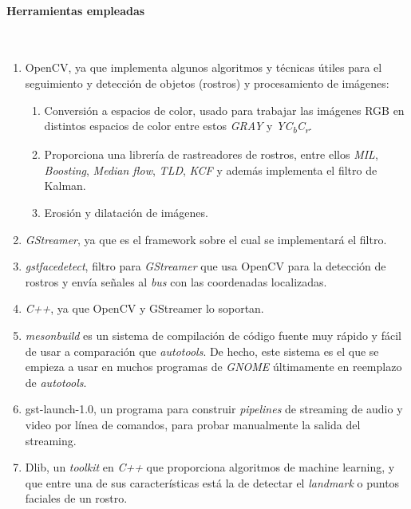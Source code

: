 \documentclass[a4paper,openright,12pt]{report}
\begin{document}
\paragraph{Herramientas empleadas}\mbox{} \\
\begin{enumerate}
    \item OpenCV, ya que implementa algunos algoritmos y técnicas
        útiles para el seguimiento y detección de objetos (rostros) y
        procesamiento de imágenes:
    \begin{enumerate}
        \item Conversión a espacios de color, usado para trabajar las imágenes
            RGB en distintos espacios de color entre estos \textit{GRAY} y
            \textit{YC\textsubscript{b}C\textsubscript{r}}.
        \item Proporciona una librería de rastreadores de rostros, entre ellos
            \textit{MIL}, \textit{Boosting}, \textit{Median flow}, \textit{TLD},
            \textit{KCF} y además implementa el filtro de Kalman.
        \item Erosión y dilatación de imágenes.
    \end{enumerate}
    \item \textit{GStreamer}, ya que es el framework sobre el cual se
        implementará el filtro.
    \item \textit{gstfacedetect}, filtro para \textit{GStreamer} que usa OpenCV
        para la detección de rostros y envía señales al \textit{bus} con las
        coordenadas localizadas.
    \item \textit{C++}, ya que OpenCV y GStreamer lo soportan.
    \item \textit{mesonbuild} es un sistema de compilación de código fuente muy
    rápido y fácil de usar a comparación que \textit{autotools}. De hecho, este
    sistema es el que se empieza a usar en muchos programas de \textit{GNOME}
    últimamente en reemplazo de \textit{autotools}.
    \item gst-launch-1.0, un programa para construir \textit{pipelines} de
    streaming de audio y video por línea de comandos, para probar manualmente
    la salida del streaming.
    \item Dlib, un \textit{toolkit} en \textit{C++} que proporciona algoritmos
    de machine learning, y que entre una de sus características está la de
    detectar el \textit{landmark} o puntos faciales de un rostro.
\end{enumerate}
\end{document}

